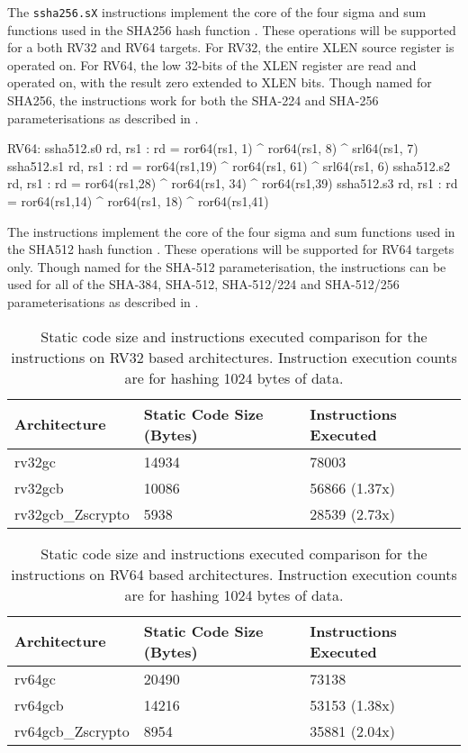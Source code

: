 The {\tt ssha256.sX}
instructions implement the core of the four sigma and sum functions used in
the SHA256 hash function \cite[Section 4.1.2]{nist:fips:180:4}.
These operations will be supported for a both RV32 and RV64 targets.
For RV32, the entire XLEN source register is operated on.
For RV64, the low 32-bits of the XLEN register are read and operated on,
with the result zero extended to XLEN bits.
Though named for SHA256, the instructions work for both the
SHA-224 and SHA-256 parameterisations as described in
\cite{nist:fips:180:4}.


\begin{cryptoisa}
RV64:
    ssha512.s0 rd, rs1 : rd = ror64(rs1, 1) ^ ror64(rs1,  8) ^ srl64(rs1, 7)
    ssha512.s1 rd, rs1 : rd = ror64(rs1,19) ^ ror64(rs1, 61) ^ srl64(rs1, 6)
    ssha512.s2 rd, rs1 : rd = ror64(rs1,28) ^ ror64(rs1, 34) ^ ror64(rs1,39)
    ssha512.s3 rd, rs1 : rd = ror64(rs1,14) ^ ror64(rs1, 18) ^ ror64(rs1,41)
\end{cryptoisa}

The 
instructions implement the core of the four sigma and sum functions used in
the SHA512 hash function \cite[Section 4.1.3]{nist:fips:180:4}.
These operations will be supported for RV64 targets only.
Though named for the SHA-512 parameterisation, the instructions
can be used for all of the SHA-384, SHA-512, SHA-512/224 and SHA-512/256
parameterisations as described in \cite{nist:fips:180:4}.

\begin{table}[]
\centering
\begin{tabular}{lll}
Architecture      & Static Code Size (Bytes) & Instructions Executed \\ \hline
rv32gc            & 14934                    & 78003                 \\
rv32gcb           & 10086                    & 56866 (1.37x)         \\
rv32gcb\_Zscrypto & 5938                     & 28539 (2.73x)
\end{tabular}
\caption{Static code size and instructions executed comparison for
the  instructions on RV32 based architectures.
Instruction execution counts are for hashing 1024 bytes of data.}
\end{table}

\begin{table}[]
\centering
\begin{tabular}{lll}
Architecture      & Static Code Size (Bytes) & Instructions Executed \\ \hline
rv64gc            & 20490                    & 73138                 \\
rv64gcb           & 14216                    & 53153 (1.38x)         \\
rv64gcb\_Zscrypto & 8954                     & 35881 (2.04x)
\end{tabular}
\caption{Static code size and instructions executed comparison for
the  instructions on RV64 based architectures.
Instruction execution counts are for hashing 1024 bytes of data.}
\end{table}


